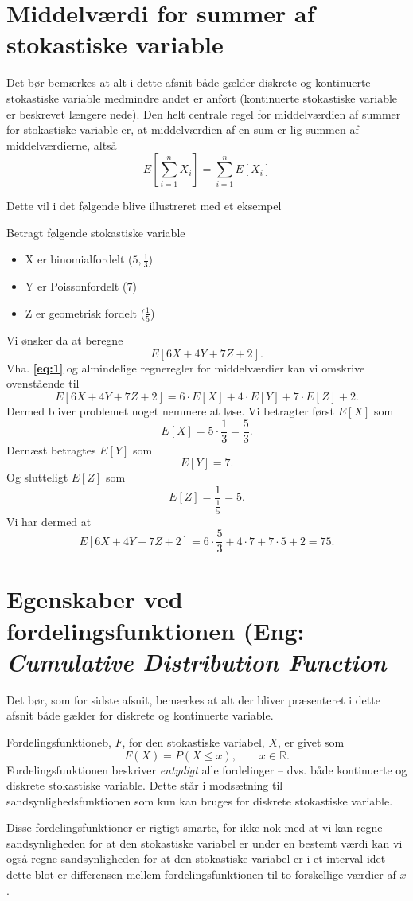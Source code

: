 \section{Middelværdi for summer af stokastiske variable}
Det bør bemærkes at alt i dette afsnit både gælder diskrete og kontinuerte stokastiske variable medmindre andet er anført (kontinuerte stokastiske variable er beskrevet længere nede). Den helt centrale regel for middelværdien af summer for stokastiske variable er, at middelværdien af en sum er lig summen af middelværdierne, altså
\begin{equation} \label{eq:1}
    E[\sum_{i = 1}^{n} X_i] = \sum_{i = 1}^{n} E[X_i] 
\end{equation}

Dette vil i det følgende blive illustreret med et eksempel
\begin{eks}
  Betragt følgende stokastiske variable
  \begin{itemize}
    \item X er binomialfordelt ($5,\frac{1}{3}$)
    \item Y er Poissonfordelt ($7$)
    \item Z er geometrisk fordelt ($\frac{1}{5}$)
  \end{itemize}
  Vi ønsker da at beregne
  \[ 
    E[6X + 4Y + 7Z + 2]
  .\]
  Vha. \textbf{\autoref{eq:1}} og almindelige regneregler for middelværdier kan vi omskrive ovenstående til
  \[ 
    E[6X + 4Y + 7Z + 2] = 6\cdot E[X] + 4\cdot E[Y] + 7\cdot E[Z] + 2
  .\]
  Dermed bliver problemet noget nemmere at løse. Vi betragter først $E[X]$ som
  \[ 
    E[X] = 5\cdot \frac{1}{3} = \frac{5}{3}
  .\]
  Dernæst betragtes $E[Y]$ som
  \[ 
    E[Y] = 7
  .\]
  Og slutteligt $E[Z]$ som
  \[ 
    E[Z] = \frac{1}{\frac{1}{5}} = 5
  .\]
  Vi har dermed at
  \[ 
    E[6X + 4Y + 7Z + 2] = 6 \cdot \frac{5}{3} + 4\cdot 7 + 7 \cdot 5 + 2 = 75
  .\]
\end{eks}

\section{Egenskaber ved fordelingsfunktionen (Eng: \textit{Cumulative Distribution Function}}
Det bør, som for sidste afsnit, bemærkes at alt der bliver præsenteret i dette afsnit både gælder for diskrete og kontinuerte variable.
\begin{sæt}
  Fordelingsfunktioneb, $F$, for den stokastiske variabel, $X$, er givet som
  \[ 
  F(X) = P(X \leq x), \qquad x \in \mathbb{R}
  .\]
  Fordelingsfunktionen beskriver \textit{entydigt} alle fordelinger -- dvs. både kontinuerte og diskrete stokastiske variable. Dette står i modsætning til sandsynlighedsfunktionen som kun kan bruges for diskrete stokastiske variable.

  Disse fordelingsfunktioner er rigtigt smarte, for ikke nok med at vi kan regne sandsynligheden for at den stokastiske variabel er under en bestemt værdi kan vi også regne sandsynligheden for at den stokastiske variabel er i et interval idet dette blot er differensen mellem fordelingsfunktionen til to forskellige værdier af $x$.
\end{sæt}

